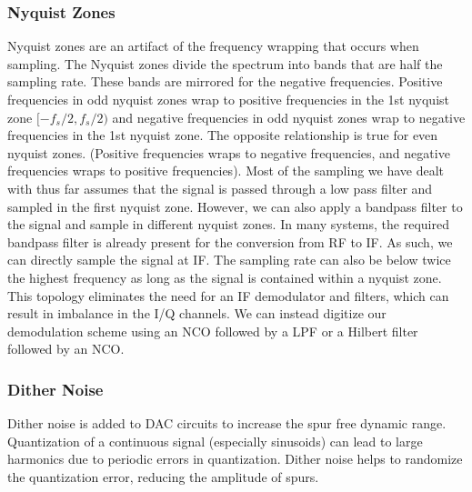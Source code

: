 \documentclass{article}
\begin{document}
		
	
	\subsubsection{Nyquist Zones}
	Nyquist zones are an artifact of the frequency wrapping that occurs when sampling. The Nyquist zones divide the spectrum into bands that are half the sampling rate. These bands are mirrored for the negative frequencies. Positive frequencies in odd nyquist zones wrap to positive frequencies in the 1st nyquist zone $[-f_s/2, f_s/2)$ and negative frequencies in odd nyquist zones wrap to negative frequencies in the 1st nyquist zone. The opposite relationship is true for even nyquist zones. (Positive frequencies wraps to negative frequencies, and negative frequencies wraps to positive frequencies). Most of the sampling we have dealt with thus far assumes that the signal is passed through a low pass filter and sampled in the first nyquist zone. However, we can also apply a bandpass filter to the signal and sample in different nyquist zones. In many systems, the required bandpass filter is already present for the conversion from RF to IF. As such, we can directly sample the signal at IF. The sampling rate can also be below twice the highest frequency as long as the signal is contained within a nyquist zone. This topology eliminates the need for an IF demodulator and filters, which can result in imbalance in the I/Q channels. We can instead digitize our demodulation scheme using an NCO followed by a LPF or a Hilbert filter followed by an NCO.
	
	
	\subsubsection{Dither Noise}
	Dither noise is added to DAC circuits to increase the spur free dynamic range. Quantization of a continuous signal (especially sinusoids) can lead to large harmonics due to periodic errors in quantization. Dither noise helps to randomize the quantization error, reducing the amplitude of spurs.
	
\end{document}

